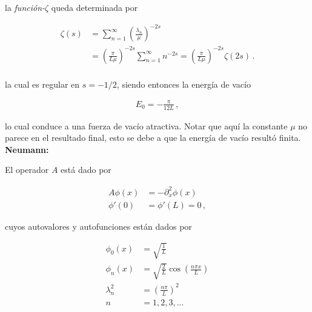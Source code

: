 la {\it función-$\zeta$} queda determinada por

\begin{equation}
\begin{aligned}
\zeta  (s) &= 
\sum _{n=1} ^{\infty} \left( \frac{\lambda _n}{\mu} \right) ^{-2s}  \\[10pt]
&= \left(  \frac{\pi}{L \mu} \right) ^{-2s}   \sum _{n=1} ^{\infty} n ^{-2s} = 
\left( \frac{\pi}{L \mu} \right) ^{-2s}  \zeta (2s) \, . \\[10pt]
\end{aligned}
\end{equation}


la cual es regular en $s=-1/2$, siendo entonces la energía de vacío

\begin{equation}
\begin{array}{c}
E _0 = - \frac{\pi}{12 L} \, ,
\end{array}
\end{equation}

lo cual conduce a una fuerza de vacío atractiva. Notar que aquí la constante $\mu$ no parece en el resultado final, esto se debe a que la energía de vacío resultó finita.\\

\textbf{Neumann:}

El operador $A$ está dado por

\begin{equation}
\begin{aligned}
	A \phi (x) &= - \partial _x ^2 \phi (x) \\[10pt]
    \phi ' (0) &= \phi ' (L) = 0 \, ,
\end{aligned}
\end{equation}



cuyos autovalores y autofunciones están dados por

\begin{equation}
\begin{aligned}
	\phi _0 (x) &= \sqrt{ \frac{1}{L} } \\[5pt]
	\phi _n (x)  &= \sqrt{\frac{2}{L}} \cos \left( \frac{n \pi x}{L} \right) \\[5pt]
	\lambda _n ^2 &= \left( \frac{n \pi }{L} \right) ^2 \\[5pt]
	n &= 1,2,3, ...
\end{aligned}
\end{equation}



